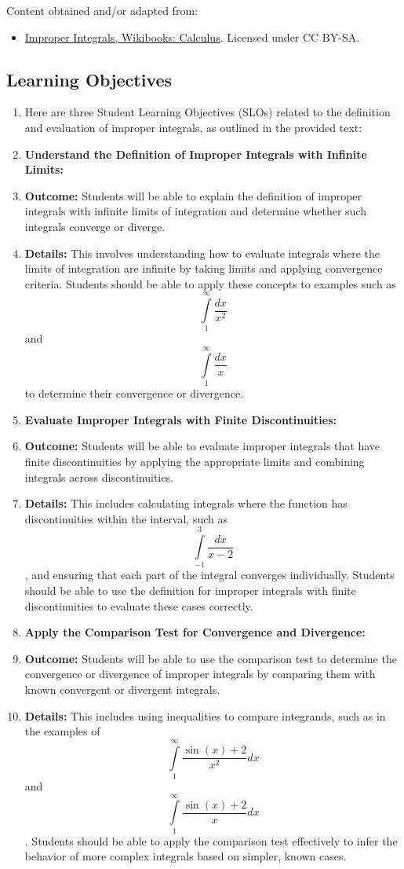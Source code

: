 Content obtained and/or adapted from:

\begin{itemize}

\item \href{https://en.wikibooks.org/wiki/Calculus/Improper_Integrals}{Improper Integrals, Wikibooks: Calculus}.  
Licensed under CC BY-SA.

\end{itemize}


\subsection{Learning Objectives}

\begin{enumerate}
    \item Here are three Student Learning Objectives (SLOs) related to the definition and evaluation of improper integrals, as outlined in the provided text:
    \item \textbf{Understand the Definition of Improper Integrals with Infinite Limits:}
    \item \textbf{Outcome:} Students will be able to explain the definition of improper integrals with infinite limits of integration and determine whether such integrals converge or diverge.
    \item \textbf{Details:} This involves understanding how to evaluate integrals where the limits of integration are infinite by taking limits and applying convergence criteria. Students should be able to apply these concepts to examples such as \[
\int\limits_1^\infty \frac{dx}{x^2}
\] and \[
\int\limits_1^\infty \frac{dx}{x}
\] to determine their convergence or divergence.
    \item \textbf{Evaluate Improper Integrals with Finite Discontinuities:}
    \item \textbf{Outcome:} Students will be able to evaluate improper integrals that have finite discontinuities by applying the appropriate limits and combining integrals across discontinuities.
    \item \textbf{Details:} This includes calculating integrals where the function has discontinuities within the interval, such as \[
\int\limits _{-1}^3 \frac{dx}{x-2}
\], and ensuring that each part of the integral converges individually. Students should be able to use the definition for improper integrals with finite discontinuities to evaluate these cases correctly.
    \item \textbf{Apply the Comparison Test for Convergence and Divergence:}
    \item \textbf{Outcome:} Students will be able to use the comparison test to determine the convergence or divergence of improper integrals by comparing them with known convergent or divergent integrals.
    \item \textbf{Details:} This includes using inequalities to compare integrands, such as in the examples of \[
\int\limits_1^\infty \frac{\sin(x)+2}{x^2}dx
\] and \[
\int\limits_1^\infty \frac{\sin(x)+2}{x}dx
\]. Students should be able to apply the comparison test effectively to infer the behavior of more complex integrals based on simpler, known cases.
\end{enumerate}

